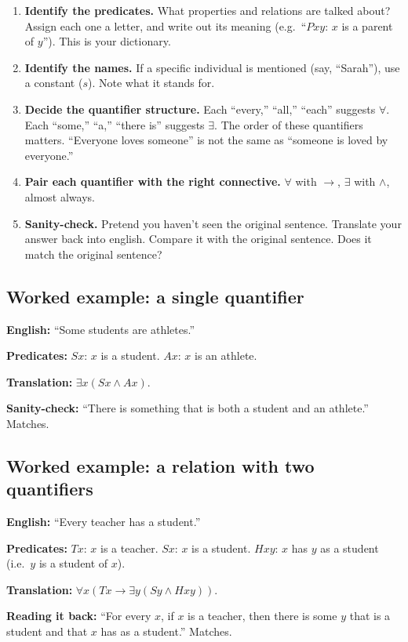 \documentclass[11pt]{article}
\begin{document}
\begin{template}
\begin{enumerate}
    \item \textbf{Identify the predicates.} What properties and relations are talked about? Assign each one a letter, and write out its meaning (e.g.~``$Pxy$: $x$ is a parent of $y$''). This is your dictionary.
    \item \textbf{Identify the names.} If a specific individual is mentioned (say, ``Sarah''), use a constant ($s$). Note what it stands for.
    \item \textbf{Decide the quantifier structure.} Each ``every,'' ``all,'' ``each'' suggests $\forall$. Each ``some,'' ``a,'' ``there is'' suggests $\exists$. The order of these quantifiers matters. ``Everyone loves someone'' is not the same as ``someone is loved by everyone.''
    \item \textbf{Pair each quantifier with the right connective.} $\forall$ with $\to$, $\exists$ with $\wedge$, almost always.
    \item \textbf{Sanity-check.} Pretend you haven't seen the original sentence. Translate your answer back into english. Compare it with the original sentence. Does it match the original sentence?
\end{enumerate}
\end{template}

\subsection{Worked example: a single quantifier}

\begin{example}[{English to $L_Q$}]
\textbf{English:} ``Some students are athletes.''

\textbf{Predicates:} $Sx$: $x$ is a student. $Ax$: $x$ is an athlete.

\textbf{Translation:} $\exists x(Sx \wedge Ax)$.

\textbf{Sanity-check:} ``There is something that is both a student and an athlete.'' Matches.
\end{example}

\subsection{Worked example: a relation with two quantifiers}

\begin{example}[{English to $L_Q$}]
\textbf{English:} ``Every teacher has a student.''

\textbf{Predicates:} $Tx$: $x$ is a teacher. $Sx$: $x$ is a student. $Hxy$: $x$ has $y$ as a student (i.e.~$y$ is a student of $x$).

\textbf{Translation:} $\forall x(Tx \to \exists y(Sy \wedge Hxy))$.

\textbf{Reading it back:} ``For every $x$, if $x$ is a teacher, then there is some $y$ that is a student and that $x$ has as a student.'' Matches.
\end{example}
\end{document}
